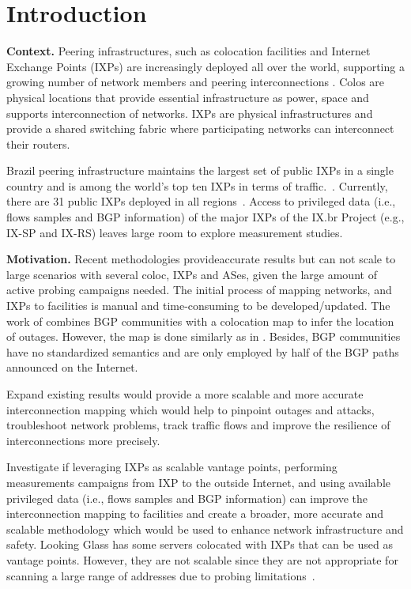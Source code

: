 \chapter{Introduction}\label{cap:introduction}
\thispagestyle{empty}

	\textbf{Context.} Peering infrastructures, such as colocation facilities and Internet Exchange Points (IXPs) are increasingly deployed all over the world, supporting a growing number of network members and peering interconnections \cite{Giotsas:2017:DPI:3098822.3098855}. Colos are physical locations that provide essential infrastructure as power, space and supports interconnection of networks. IXPs are physical infrastructures and provide a shared switching fabric where participating networks can interconnect their routers. \cite{Giotsas:2015:MPI:2716281.2836122}

	Brazil peering infrastructure maintains the largest set of public IXPs in a single country and is among the world’s top ten IXPs in terms of traffic.~\cite{DissectingBrazilianIXP}. Currently, there are 31 public IXPs deployed in all regions~\cite{IXbr}. Access to privileged data (i.e., flows samples and BGP information) of the major IXPs of the IX.br Project (e.g., IX-SP and IX-RS) leaves large room to explore measurement studies. 

	\textbf{Motivation.} Recent methodologies \cite{Giotsas:2015:MPI:2716281.2836122} provideaccurate results but can not scale to large scenarios with several coloc, IXPs and ASes, given the large amount of active probing campaigns needed. The initial process of mapping networks, and IXPs to facilities is manual and time-consuming to be developed/updated. The work of \cite{Giotsas:2017:DPI:3098822.3098855} combines BGP communities with a colocation map to infer the location of outages. However, the map is done similarly as in \cite{Giotsas:2015:MPI:2716281.2836122}. Besides, BGP communities have no standardized semantics and are only employed by half of the BGP paths announced on the Internet.

	Expand existing results would provide a more scalable and more accurate interconnection mapping which would help to pinpoint outages and attacks, troubleshoot network problems, track traffic flows and improve the resilience of interconnections more precisely.

	Investigate if leveraging IXPs as scalable vantage points, performing measurements campaigns from IXP to the outside Internet, and using available privileged data (i.e., flows samples and BGP information) can improve the interconnection mapping to facilities and create a broader, more accurate and scalable methodology which would be used to enhance network infrastructure and safety. 
	Looking Glass has some servers colocated with IXPs that can be used as vantage points. However, they are not scalable since they are not appropriate for scanning a large range of addresses due to probing limitations~\cite{Giotsas:2015:MPI:2716281.2836122}.


